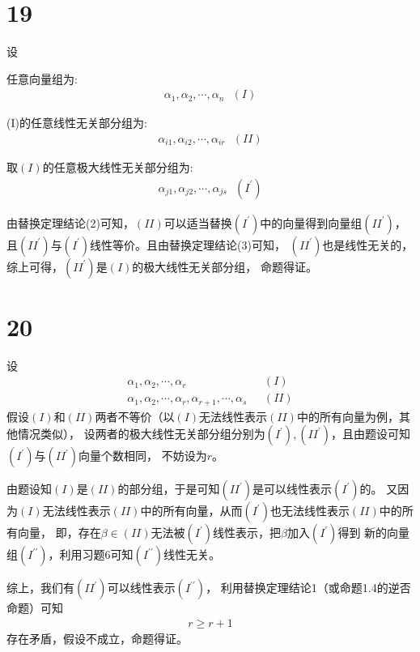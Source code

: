 \documentclass{article}
\begin{document}
\section*{19}

设

任意向量组为:
\begin{align*}
  \alpha_1, \alpha_2, \cdots, \alpha_n \ \ \ (I)
\end{align*}

(I)的任意线性无关部分组为:
\begin{align*}
  \alpha_{i1}, \alpha_{i2}, \cdots, \alpha_{ir} \ \ \ (II)
\end{align*}

取$(I)$的任意极大线性无关部分组为:
\begin{align*}
  \alpha_{j1}, \alpha_{j2}, \cdots, \alpha_{js} \ \ \ (I^\prime)
\end{align*}

由替换定理结论(2)可知，$(II)$可以适当替换$(I^\prime)$中的向量得到向量组$(II^\prime)$，
且$(II^\prime)$与$(I^\prime)$线性等价。且由替换定理结论(3)可知，
$(II^\prime)$也是线性无关的，综上可得，$(II^\prime)$是$(I)$的极大线性无关部分组，
命题得证。

\section*{20}

设
\begin{align*}
  \alpha_1, \alpha_2, \cdots, \alpha_r                                     & \ \ \ (I)  \\
  \alpha_1, \alpha_2, \cdots, \alpha_r, \alpha_{r + 1}, \cdots, \alpha_{s} & \ \ \ (II)
\end{align*}
假设$(I)$和$(II)$两者不等价（以$(I)$无法线性表示$(II)$中的所有向量为例，其他情况类似），
设两者的极大线性无关部分组分别为$(I^\prime), (II^\prime)$，且由题设可知$(I^\prime)$与$(II^\prime)$向量个数相同，
不妨设为$r$。

由题设知$(I)$是$(II)$的部分组，于是可知$(II^\prime)$是可以线性表示$(I^\prime)$的。
又因为$(I)$无法线性表示$(II)$中的所有向量，从而$(I^\prime)$也无法线性表示$(II)$中的所有向量，
即，存在$\beta \in (II)$无法被$(I^\prime)$线性表示，把$\beta$加入$(I^\prime)$得到
新的向量组$(I^{\prime\prime})$，利用习题6可知$(I^{\prime\prime})$线性无关。

综上，我们有$(II^\prime)$可以线性表示$(I^{\prime\prime})$，
利用替换定理结论1（或命题1.4的逆否命题）可知
\begin{align*}
  r \geq r + 1
\end{align*}
存在矛盾，假设不成立，命题得证。
\end{document}
